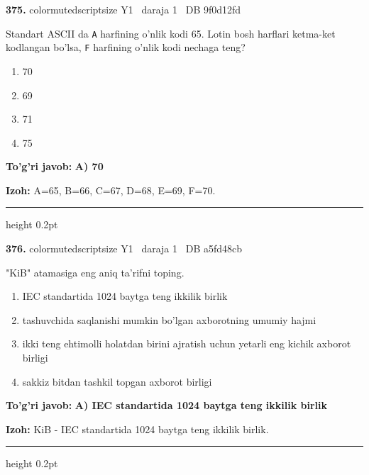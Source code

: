 \documentclass[10pt,a4paper,oneside]{article}
\begin{document}
\noindent\textbf{\color{ink}375.}  {color{muted}scriptsize Y1 \textbullet\ daraja 1 \textbullet\ DB 9f0d12fd}
\par
Standart ASCII da \texttt{A} harfining o'nlik kodi 65. Lotin bosh harflari ketma-ket kodlangan bo'lsa, \texttt{F} harfining o'nlik kodi nechaga teng?
\begin{enumerate}[label=\Alph*),leftmargin=9mm]
\item 70
\item 69
\item 71
\item 75
\end{enumerate}
\begin{tcolorbox}[enhanced,breakable,colback=teal!4,colframe=teal!50!black,boxrule=0.5pt,arc=1.1mm,left=3mm,right=3mm,top=1.7mm,bottom=1.7mm,before skip=2mm,after skip=2mm]
\textbf{\color{teal}To'g'ri javob:} \textbf{A) 70}
\par\smallskip
\textbf{Izoh:} A=65, B=66, C=67, D=68, E=69, F=70.
\end{tcolorbox}
\vspace{2mm}\hrule height 0.2pt \vspace{3mm}

\noindent\textbf{\color{ink}376.}  {color{muted}scriptsize Y1 \textbullet\ daraja 1 \textbullet\ DB a5fd48cb}
\par
"KiB" atamasiga eng aniq ta'rifni toping.
\begin{enumerate}[label=\Alph*),leftmargin=9mm]
\item IEC standartida 1024 baytga teng ikkilik birlik
\item tashuvchida saqlanishi mumkin bo'lgan axborotning umumiy hajmi
\item ikki teng ehtimolli holatdan birini ajratish uchun yetarli eng kichik axborot birligi
\item sakkiz bitdan tashkil topgan axborot birligi
\end{enumerate}
\begin{tcolorbox}[enhanced,breakable,colback=teal!4,colframe=teal!50!black,boxrule=0.5pt,arc=1.1mm,left=3mm,right=3mm,top=1.7mm,bottom=1.7mm,before skip=2mm,after skip=2mm]
\textbf{\color{teal}To'g'ri javob:} \textbf{A) IEC standartida 1024 baytga teng ikkilik birlik}
\par\smallskip
\textbf{Izoh:} KiB - IEC standartida 1024 baytga teng ikkilik birlik.
\end{tcolorbox}
\vspace{2mm}\hrule height 0.2pt \vspace{3mm}
\end{document}
